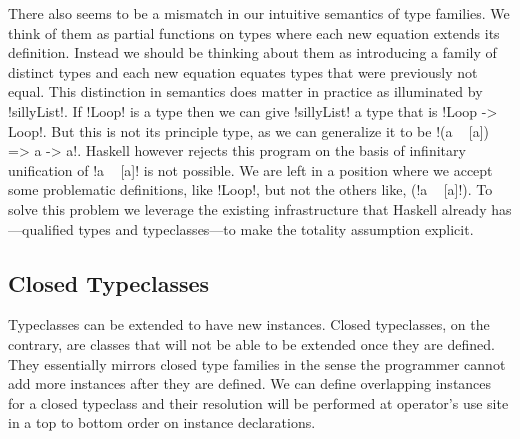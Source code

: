 \documentclass[format=acmsmall,manuscript,review,screen,nonacm,margin=1in,11pt]{acmart}
\begin{document}
There also seems to be a mismatch in our intuitive semantics of type families. We think
of them as partial functions on types where each new equation extends its definition. Instead
we should be thinking about them as introducing a family of distinct types and
each new equation equates types that were previously not equal. This distinction in semantics
does matter in practice as illuminated by !sillyList!. If !Loop! is a type then we
can give !sillyList! a type that is !Loop -> Loop!. But this is not its principle type,
as we can generalize it to be  !(a ~ [a]) => a -> a!. Haskell however rejects this program
on the basis of infinitary unification of !a ~ [a]! is not possible. We are left in a position
where we accept some problematic definitions, like !Loop!, but not the others like, (!a ~ [a]!).
To solve this problem we leverage the existing infrastructure that Haskell already has---qualified
types and typeclasses---to make the totality assumption explicit.


\subsection{Closed Typeclasses}
Typeclasses can be extended to have new instances. Closed typeclasses, on the contrary,
are classes that will not be able to be extended once they are defined. They essentially
mirrors closed type families in the sense the programmer cannot add more instances after they
are defined. We can define overlapping instances for a closed typeclass and their resolution
will be performed at operator's use site in a top to bottom order on instance declarations.
\end{document}
